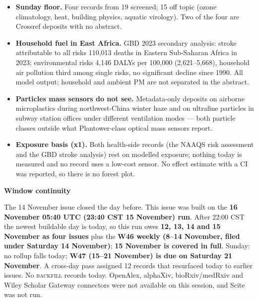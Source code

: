 \documentclass[10pt]{article}
\begin{document}
\footnotesize
\begin{itemize}

\item \textbf{Sunday floor.} Four records from 19 screened; 15 off topic (ozone climatology, heat, building physics, aquatic virology). Two of the four are Crossref deposits with no abstract.

\item \textbf{Household fuel in East Africa.} GBD 2023 secondary analysis: stroke attributable to all risks 110,013 deaths in Eastern Sub-Saharan Africa in 2023; environmental risks 4,146 DALYs per 100,000 (2,621--5,668), household air pollution third among single risks, no significant decline since 1990. All model output; household and ambient PM are not separated in the abstract.

\item \textbf{Particles mass sensors do not see.} Metadata-only deposits on airborne microplastics during northwest-China winter haze and on ultrafine particles in subway station offices under different ventilation modes --- both particle classes outside what Plantower-class optical mass sensors report.

\item \textbf{Exposure basis (x1).} Both health-side records (the NAAQS risk assessment and the GBD stroke analysis) rest on modelled exposure; nothing today is measured and no record uses a low-cost sensor. No effect estimate with a CI was reported, so there is no forest plot.

\end{itemize}

\vspace{2mm}

\begin{keybox}
{\sffamily\bfseries\footnotesize\color{Deep}Window continuity}\\[1.2mm]
{\fontsize{7.2}{8.8}\selectfont
The 14 November issue closed the day before. This issue was built on the \textbf{16 November 05:40 UTC (23:40 CST 15 November) run}. After 22:00 CST the newest buildable day is today, so this run owes \textbf{12, 13, 14 and 15 November as four issues} plus the \textbf{W46 weekly (8--14 November, filed under Saturday 14 November)}; \textbf{15 November is covered in full}. Sunday: no rollup falls today; \textbf{W47 (15--21 November) is due on Saturday 21 November}. A cross-day pass assigned 12 records that resurfaced today to earlier issues. No \textsc{backfill} records today. OpenAlex, alphaXiv, bioRxiv/medRxiv and Wiley Scholar Gateway connectors were not available on this session, and Scite was not run.\par}
\end{keybox}
\end{document}
